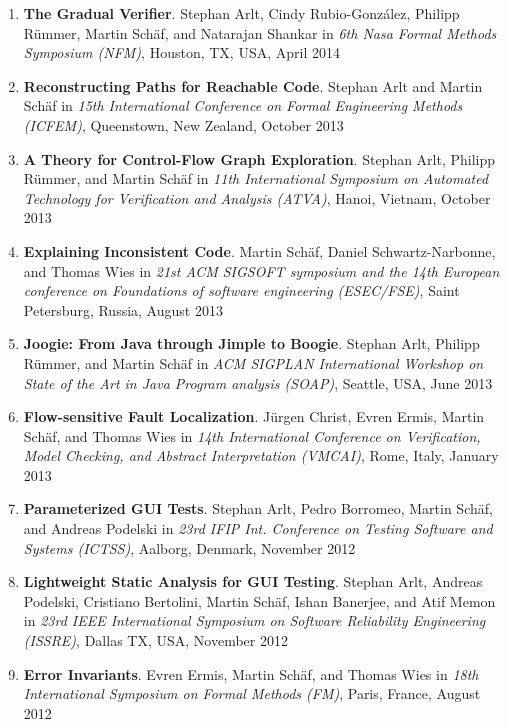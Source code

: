 \begin{enumerate}
\item \textbf{The Gradual Verifier}.
Stephan Arlt, Cindy Rubio-Gonz\'alez, Philipp R\"ummer,
Martin Sch\"af, and Natarajan Shankar in \emph{6th Nasa Formal Methods
Symposium (NFM)}, Houston, TX, USA, April 2014


\item \textbf{Reconstructing Paths for Reachable Code}.
Stephan Arlt and  Martin Sch\"af in \emph{15th International Conference on
Formal Engineering Methods (ICFEM)}, Queenstown, New Zealand, October 2013


\item \textbf{A Theory for Control-Flow Graph Exploration}.
Stephan Arlt, Philipp R\"ummer, and  Martin Sch\"af in \emph{11th International
Symposium on Automated Technology for Verification and Analysis (ATVA)},
Hanoi, Vietnam, October 2013

\item \textbf{Explaining Inconsistent Code}.  
Martin Sch\"af, Daniel Schwartz-Narbonne, and Thomas Wies in \emph{21st ACM
SIGSOFT symposium and the 14th European conference on Foundations of software
engineering (ESEC/FSE)}, Saint Petersburg, Russia, August 2013


\item \textbf{Joogie: From Java through Jimple to Boogie}. Stephan
Arlt, Philipp R\"ummer, and  Martin Sch\"af  in \emph{ ACM SIGPLAN International Workshop 
on State of the Art in Java Program analysis (SOAP)}, Seattle, USA, June 2013


\item \textbf{Flow-sensitive Fault Localization}.  J\"urgen Christ, Evren Ermis, Martin Sch\"af, 
and Thomas Wies in \emph{14th International Conference on Verification, Model Checking, and 
Abstract Interpretation (VMCAI)}, Rome, Italy, January 2013

\item \textbf{Parameterized GUI Tests}. Stephan
Arlt, Pedro Borromeo,  Martin Sch\"af, and Andreas Podelski  in \emph{ 23rd
IFIP Int. Conference on Testing Software and Systems (ICTSS)}, Aalborg, Denmark,
November 2012

  
\item \textbf{Lightweight Static Analysis for GUI Testing}. Stephan
Arlt, Andreas Podelski, Cristiano Bertolini, Martin Sch\"af, Ishan Banerjee, and
Atif Memon in \emph{ 23rd IEEE International Symposium on Software Reliability
Engineering (ISSRE)}, Dallas TX, USA, November 2012


\item \textbf{Error Invariants}. Evren Ermis, Martin Sch\"af, and Thomas Wies in
\emph{18th International Symposium on Formal Methods (FM)}, Paris, France,
August 2012


\end{enumerate}
